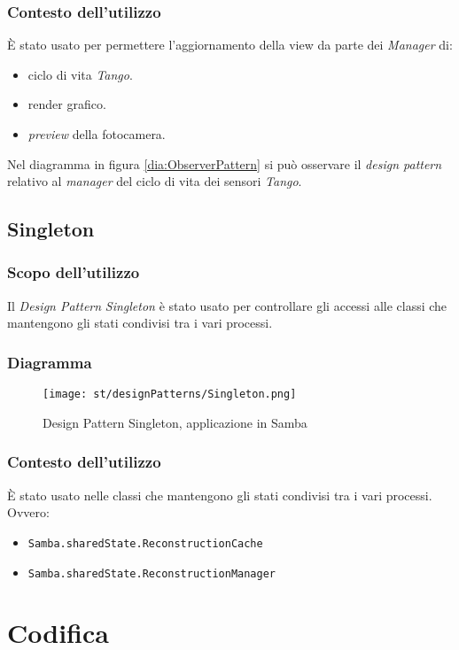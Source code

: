 \subsubsection{Contesto dell'utilizzo}
È stato usato per permettere l'aggiornamento della view da parte dei \emph{Manager} di:
\begin{itemize}
	\item ciclo di vita \emph{Tango}.
	\item render grafico.
	\item \emph{preview} della fotocamera.
\end{itemize}
Nel diagramma in figura \ref{dia:ObserverPattern} si può osservare il \emph{design pattern} relativo al \emph{manager} del ciclo di vita dei sensori \emph{Tango}.

\subsection{Singleton}
\subsubsection{Scopo dell'utilizzo}
Il \emph{Design Pattern} \emph{Singleton} è stato usato per controllare gli accessi alle classi che mantengono gli stati condivisi tra i vari processi. 
\subsubsection{Diagramma}
\begin{figure}[H] 
    \centering 
    \texttt{[image: st/designPatterns/Singleton.png]} 
    \caption{Design Pattern Singleton, applicazione in Samba}
\end{figure}
\subsubsection{Contesto dell'utilizzo}
È stato usato nelle classi che mantengono gli stati condivisi tra i vari processi. Ovvero:
\begin{itemize}
	\item \texttt{Samba.sharedState.ReconstructionCache}
	\item \texttt{Samba.sharedState.ReconstructionManager}	
\end{itemize}


\section{Codifica}




























